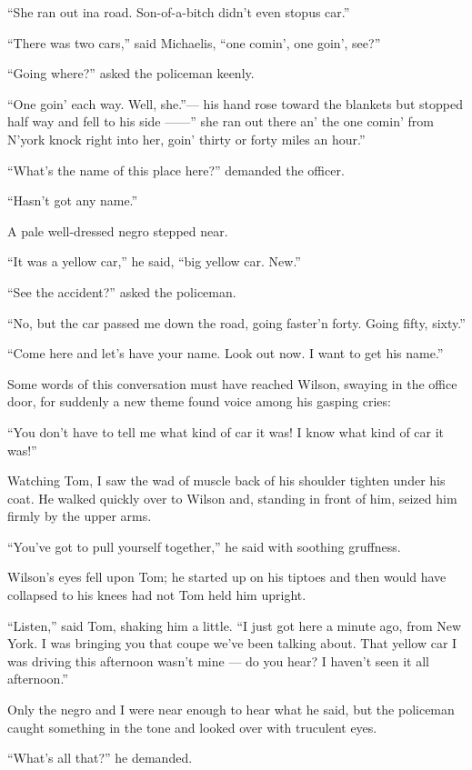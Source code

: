 \documentclass{znotebook}
\begin{document}
``She ran out ina road. Son-of-a-bitch didn’t even stopus car.''

``There was two cars,'' said Michaelis, ``one comin’, one goin’, see?''

``Going where?'' asked the policeman keenly.

``One goin’ each way. Well, she.''— his hand rose toward the blankets but stopped half way and fell to his side ——'' she ran out there an’ the one comin’ from N’york knock right into her, goin’ thirty or forty miles an hour.''

``What’s the name of this place here?'' demanded the officer.

``Hasn’t got any name.''

A pale well-dressed negro stepped near.

``It was a yellow car,'' he said, ``big yellow car. New.''

``See the accident?'' asked the policeman.

``No, but the car passed me down the road, going faster’n forty. Going fifty, sixty.''

``Come here and let’s have your name. Look out now. I want to get his name.''

Some words of this conversation must have reached Wilson, swaying in the office door, for suddenly a new theme found voice among his gasping cries:

``You don’t have to tell me what kind of car it was! I know what kind of car it was!''

Watching Tom, I saw the wad of muscle back of his shoulder tighten under his coat. He walked quickly over to Wilson and, standing in front of him, seized him firmly by the upper arms.

``You’ve got to pull yourself together,'' he said with soothing gruffness.

Wilson’s eyes fell upon Tom; he started up on his tiptoes and then would have collapsed to his knees had not Tom held him upright.

``Listen,'' said Tom, shaking him a little. ``I just got here a minute ago, from New York. I was bringing you that coupe we’ve been talking about. That yellow car I was driving this afternoon wasn’t mine — do you hear? I haven’t seen it all afternoon.''

Only the negro and I were near enough to hear what he said, but the policeman caught something in the tone and looked over with truculent eyes.

``What’s all that?'' he demanded.
\end{document}
